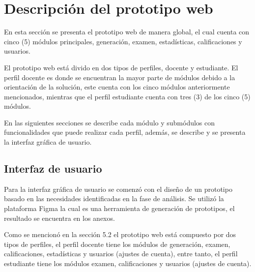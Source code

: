 \documentclass[../Main.tex]{subfiles}
\begin{document}
\section{Descripción del prototipo web}
    \begin{justify}
    En esta sección se presenta el prototipo web de manera global, el cual cuenta con cinco (5) módulos principales, generación, examen, estadísticas, calificaciones y usuarios.
    
    El prototipo web está divido en dos tipos de perfiles, docente y estudiante. El perfil docente es donde se encuentran la mayor parte de módulos debido a la orientación de la solución, este cuenta con los cinco módulos anteriormente mencionados, mientras que el perfil estudiante cuenta con tres (3) de los cinco (5) módulos.
    
    En las siguientes secciones se describe cada módulo y submódulos con funcionalidades que puede realizar cada perfil, además, se describe y se presenta la interfaz gráfica de usuario.
    \end{justify}
    
\newpage
    \subsection{Interfaz de usuario}
    \begin{justify}
    Para la interfaz gráfica de usuario se comenzó con el diseño de un prototipo basado en las necesidades identificadas en la fase de análisis. Se utilizó la plataforma Figma la cual es una herramienta de generación de prototipos, el resultado se encuentra en los anexos.
    
    Como se mencionó en la sección 5.2 el prototipo web está compuesto por dos tipos de perfiles, el perfil docente tiene los módulos de generación, examen, calificaciones, estadísticas y usuarios (ajustes de cuenta), entre tanto, el perfil estudiante tiene los módulos examen, calificaciones y usuarios (ajustes de cuenta).
    \end{justify}
    
\end{document}
